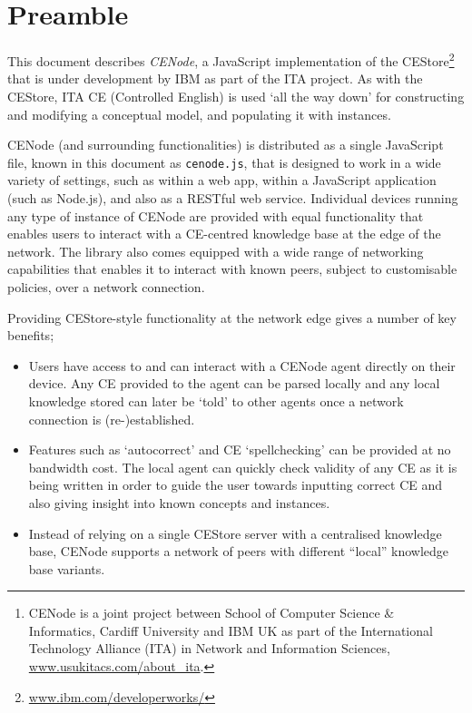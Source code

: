\documentclass{scrartcl}
\title{\ce{cenode.js}}
\subtitle{Revision 2.0}
\author{W.M. Webberley \& A. Preece\footnote{CENode is a joint project between School of Computer Science \& Informatics, Cardiff University and IBM UK as part of the International Technology Alliance (ITA) in Network and Information Sciences, \href{http://www.usukitacs.com/about_ita}{www.usukitacs.com/about\_ita}.}\\ \href{http://cwenode.io}{cenode.io} $|$ \href{mailto:info@cenode.io}{info@cenode.io}}
\date{}
\newcommand{\js}[1]{\texttt{#1}}
\begin{document}
\maketitle

\section{Preamble}
This document describes \textit{CENode}, a JavaScript implementation of the CEStore\footnote{\href{https://www.ibm.com/developerworks/community/groups/service/html/communityview?communityUuid=558d55b6-78b6-43e6-9c14-0792481e4532}{www.ibm.com/developerworks/}} that is under development by IBM as part of the ITA project. As with the CEStore, ITA CE (Controlled English) is used `all the way down' for constructing and modifying a conceptual model, and populating it with instances. 

CENode (and surrounding functionalities) is distributed as a single JavaScript file, known in this document as \js{cenode.js}, that is designed to work in a wide variety of settings, such as within a web app, within a JavaScript application (such as Node.js), and also as a RESTful web service. Individual devices running any type of instance of CENode are provided with equal functionality that enables users to interact with a CE-centred knowledge base at the edge of the network. The library also comes equipped with a wide range of networking capabilities that enables it to interact with known peers, subject to customisable policies, over a network connection.

Providing CEStore-style functionality at the network edge gives a number of key benefits;
\begin{itemize}
    \item Users have access to and can interact with a CENode agent directly on their device. Any CE provided to the agent can be parsed locally and any local knowledge stored can later be `told' to other agents once a network connection is (re-)established.
    \item Features such as `autocorrect' and CE `spellchecking' can be provided at no bandwidth cost. The local agent can quickly check validity of any CE as it is being written in order to guide the user towards inputting correct CE and also giving insight into known concepts and instances.
    \item Instead of relying on a single CEStore server with a centralised knowledge base, CENode supports a network of peers with different ``local'' knowledge base variants.
\end{itemize}
\end{document}
